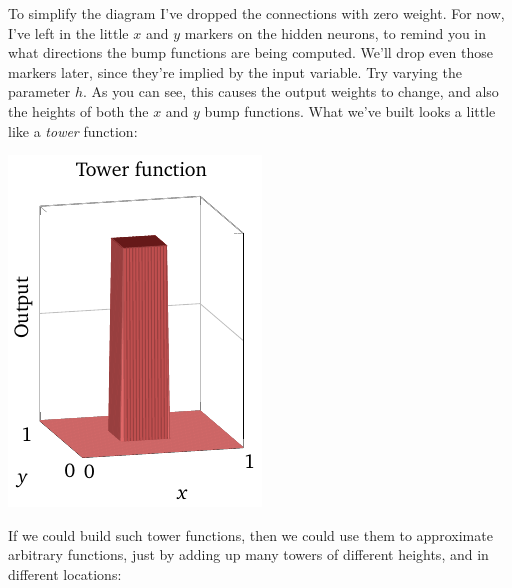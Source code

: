 \documentclass[a4paper,twoside,10pt]{book}
\begin{document}
To simplify the diagram I've dropped the connections with zero weight. For now, I've left in the little $x$ and $y$ markers on the hidden neurons, to remind you in what directions the bump functions are being computed. We'll drop even those markers later, since they're implied by the input variable.
%
Try varying the parameter $h$. As you can see, this causes the output weights to change, and also the heights of both the $x$ and $y$ bump functions.
%
What we've built looks a little like a \textit{tower} function:
\begin{center}
\includegraphics[width=0.32\linewidth]{./figures/ch4/3d/towerfunction}%
\end{center}
%
If we could build such tower functions, then we could use them to approximate arbitrary functions, just by adding up many towers of different heights, and in different locations:
\end{document}
